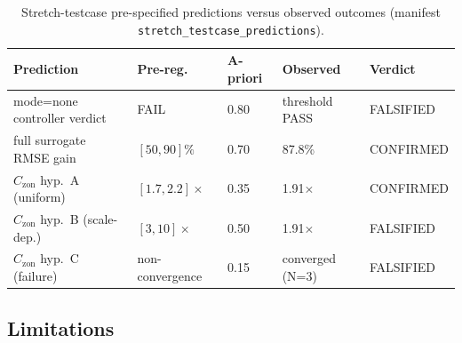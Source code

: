 \documentclass[11pt,a4paper]{article}
\begin{document}
\begin{table}[H]
\centering
\small
\caption{Stretch-testcase pre-specified predictions versus observed outcomes (manifest \texttt{stretch\_testcase\_predictions}).}
\label{tab:predictions}
\begin{tabularx}{\linewidth}{>{\raggedright\arraybackslash}X l l l l}
\toprule
Prediction & Pre-reg.\ & A-priori & Observed & Verdict \\
\midrule
mode=none controller verdict & FAIL & 0.80 & threshold PASS & FALSIFIED \\
full surrogate RMSE gain & $[50,90]\%$ & 0.70 & 87.8\% & CONFIRMED \\
$C_{\mathrm{zon}}$ hyp.\ A (uniform) & $[1.7,2.2]\times$ & 0.35 & 1.91$\times$ & CONFIRMED \\
$C_{\mathrm{zon}}$ hyp.\ B (scale-dep.) & $[3,10]\times$ & 0.50 & 1.91$\times$ & FALSIFIED \\
$C_{\mathrm{zon}}$ hyp.\ C (failure) & non-convergence & 0.15 & converged (N=3) & FALSIFIED \\
\bottomrule
\end{tabularx}
\end{table}

\subsection{Limitations}
\label{ssec:b3lim}
\end{document}
